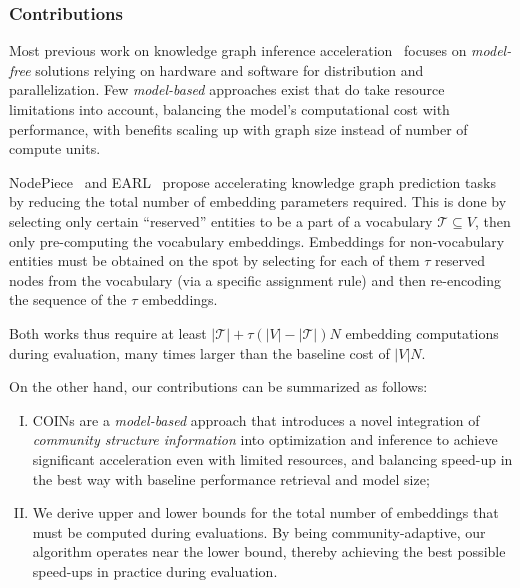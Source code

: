 \subsubsection{Contributions}
Most previous work on knowledge graph inference acceleration~\cite{lerer_pytorch-biggraph_2019,zheng_dgl-ke_2020,ren_smore_2021} focuses on \emph{model-free} solutions relying on hardware and software for distribution and parallelization. Few \emph{model-based} approaches exist that do take resource limitations into account, balancing the model's computational cost with performance, with benefits scaling up with graph size instead of number of compute units.

NodePiece~\cite{galkin_nodepiece_2022} and EARL~\cite{chen_entity-agnostic_2023} propose accelerating knowledge graph prediction tasks by reducing the total number of embedding parameters required. This is done by selecting only certain \enquote{reserved} entities to be a part of a vocabulary $\mathcal{T} \subseteq V$, then only pre-computing the vocabulary embeddings. Embeddings for non-vocabulary entities must be obtained on the spot by selecting for each of them $\tau$ reserved nodes from the vocabulary (via a specific assignment rule) and then re-encoding the sequence of the $\tau$ embeddings. 

Both works thus require at least $|\mathcal{T}| + \tau(|V|-|\mathcal{T}|)N$ embedding computations during evaluation, many times larger than the baseline cost of $|V|N$.

On the other hand, our contributions can be summarized as follows: %
\begin{enumerate}[I.]
    \item COINs are a \emph{model-based} approach that introduces a novel integration of \emph{community structure information} into optimization and inference to achieve significant acceleration even with limited resources, and balancing speed-up in the best way with baseline performance retrieval and model size;
    \item We derive upper and lower bounds for the total number of embeddings that must be computed during evaluations. By being community-adaptive, our algorithm operates near the lower bound, thereby achieving the best possible speed-ups in practice during evaluation. 
    
\end{enumerate}


